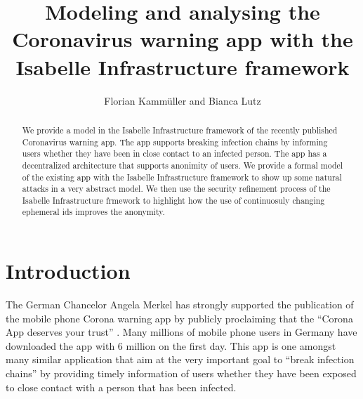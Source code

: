 \documentclass{llncs}
\begin{document}
\frontmatter
  
\mainmatter
\title{Modeling and analysing the Coronavirus warning app with the Isabelle Infrastructure framework}
\author{Florian Kamm\"uller and Bianca Lutz}

\maketitle
\begin{abstract}
We provide a model in the Isabelle Infrastructure framework of the recently published
Coronavirus warning app. The app supports breaking infection chains by informing users
whether they have been in close contact to an infected person. The app has a decentralized
architecture that supports anonimity of users.
We provide a formal model of the existing app with the Isabelle Infrastructure framework
to show up some natural attacks in a very abstract model. We then use the security
refinement process of the Isabelle Infrastructure frmework to highlight how the use of
continuosuly changing ephemeral ids improves the anonymity.
\end{abstract}

\section{Introduction}
\label{sec:intro}
The German Chancelor Angela Merkel has strongly supported the publication of
the mobile phone Corona warning app by publicly proclaiming that the ``Corona
App deserves your trust'' \cite{bundes:20}. Many millions of mobile phone users
in Germany have downloaded the app with 6 million on the first day.
This app is one amongst many similar application that aim at the very important goal
to ``break infection chains'' by providing timely information of users whether they
have been exposed to close contact with a person that has been infected.
\end{document}
